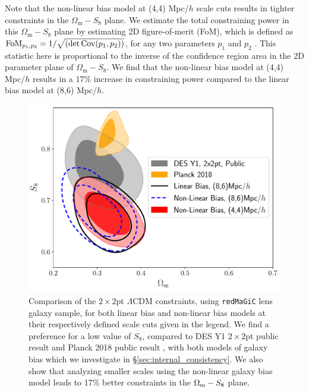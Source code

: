 \documentclass[aps, prd,twocolumn,superscriptaddress,nofootinbib,preprintnumbers]{revtex4-1}
\newcommand{\om}{\ensuremath{\Omega_{\mathrm m}}}
\newcommand{\redmagic}{\texttt{redMaGiC} }
\begin{document}
Note that the non-linear bias model at (4,4) Mpc/$h$ scale cuts results in tighter constraints in the $\om-S_8$ plane. 
We estimate the total constraining power in this $\om-S_8$ plane by estimating 2D figure-of-merit (FoM), which is defined as ${\rm FoM}_{p_1,p_2} = 1/\sqrt{({\rm det \, Cov}(p_1,p_2))}$, for any two parameters $p_1$ and $p_2$ \citep{Huterer_2001, Wang_2008}. This statistic here is proportional to the inverse of the confidence region area in the 2D parameter plane of $\om-S_8$.
We find that the non-linear bias model at  (4,4) Mpc/$h$ results in a $17$\% increase in constraining power compared to the linear bias model at (8,6) Mpc/$h$. 


\begin{figure}
\includegraphics[width=\columnwidth]{figs/data_lcdm_comp.pdf}
\caption[]{Comparison of the $2\times2$pt $\Lambda$CDM constraints, using \redmagic lens galaxy sample, for both linear bias and non-linear bias models at their respectively defined scale cuts given in the legend. We find a preference for a low value of $S_8$, compared to DES Y1 $2\times2$pt public result \citep{Abbott_2018} and Planck 2018 public result \citep{Planck_2018_cosmo}, with both models of galaxy bias which we investigate in \S\ref{sec:internal_consistency}. We also show that analyzing smaller scales using the non-linear galaxy bias model leads to 17\% better constraints in the $\Omega_{\rm m} - S_8$ plane. }\label{fig:des_comp}
\end{figure}
\end{document}

